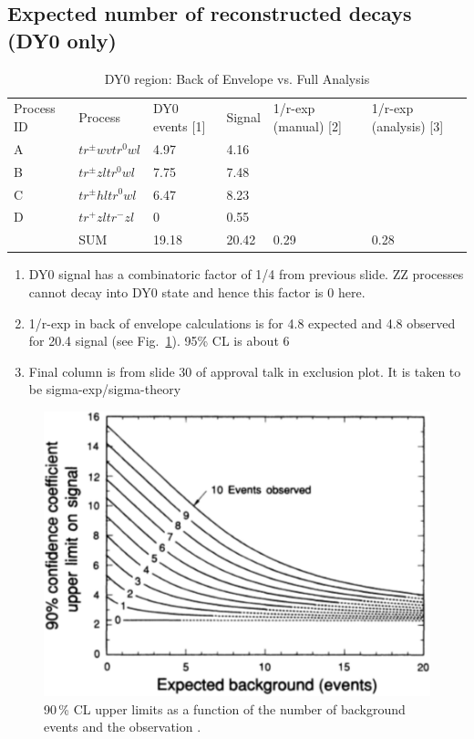 \subsection*{Expected number of reconstructed decays (DY0 only)}

\begin{table}[h!]
\centering
\caption{DY0 region: Back of Envelope vs. Full Analysis} %
\begin{tabular}{llllll}
Process ID & Process       & DY0 events [1] & Signal & 1/r-exp (manual) [2] & 1/r-exp (analysis) [3] \\
A          & $tr^\pm wvtr^0wl$ & 4.97                                & 4.16                     &                                   &                               \\
B          & $tr^\pm zltr^0wl$ & 7.75                                & 7.48                     &                                   &                               \\
C          & $tr^\pm hltr^0wl$ & 6.47                                & 8.23                     &                                   &                               \\
D          & $tr^+zltr^-zl$    & 0                                   & 0.55                     &                                   &                               \\
           & SUM           & 19.18                               & 20.42                    & 0.29                              & 0.28                         
\end{tabular}
\end{table}

\begin{enumerate}
	\item DY0 signal has a combinatoric factor of 1/4 from previous slide. ZZ processes cannot decay into DY0 state and hence this factor is 0 here.
	\item 1/r-exp in back of envelope calculations is for 4.8 expected and 4.8 observed for 20.4 signal (see Fig.~\ref{fig:limitEstimate}). 95\% CL is about 6
	\item Final column is from slide 30 of approval talk in exclusion plot. It is taken to be sigma-exp/sigma-theory
\end{enumerate}

\begin{figure}[h!]
\begin{center}
	\includegraphics[width=.5\textwidth]{Appendix/limitEstimate}
	\caption{90\,\% CL upper limits as a function of the number of background events and the observation \cite{Hikasa:1992je}.
	\label{fig:limitEstimate}}
\end{center}
\end{figure}
